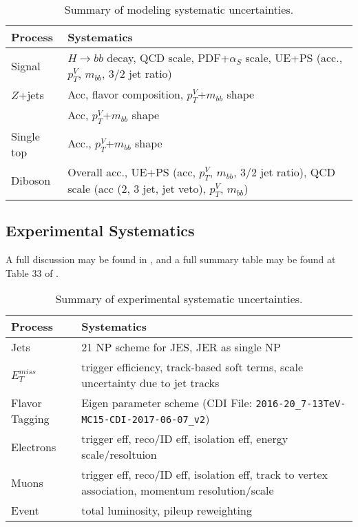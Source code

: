 \begin{table}[!htbp]
  \begin{center}
    \begin{tabular}{lp{5in}}
      \hline\hline
      Process & Systematics\\
      \hline
      Signal  & $H\to bb$ decay, QCD scale, PDF+$\alpha_S$ scale, UE+PS (acc., $p_T^V$, $m_{bb}$, 3/2 jet ratio)\\
      $Z$+jets  & Acc, flavor composition, $p_T^V$+$m_{bb}$ shape\\
      \tt  & Acc, $p_T^V$+$m_{bb}$ shape\\
      Single top  & Acc., $p_T^V$+$m_{bb}$ shape\\
      Diboson  &  Overall acc., UE+PS (acc, $p_T^V$, $m_{bb}$, 3/2 jet ratio), QCD scale  (acc (2, 3 jet, jet veto), $p_T^V$, $m_{bb}$)\\
      \hline\hline
    \end{tabular}
  \end{center}
  \caption{Summary of modeling systematic uncertainties.}
  \label{tab:modelsys}
\end{table}

\subsection{Experimental Systematics}
A full discussion may be found in \cite{objectnote}, and a full summary table may be found at Table 33 of \cite{supportnote}.
\begin{table}[!htbp]
  \begin{center}
    \begin{tabular}{lp{5in}}
      \hline\hline
      Process & Systematics\\
      \hline
      Jets  & 21 NP scheme for JES, JER as single NP\\
      $E_T^{miss}$  & trigger efficiency, track-based soft terms, scale uncertainty due to jet tracks\\
      Flavor Tagging  & Eigen parameter scheme (CDI File: \texttt{2016-20\_7-13TeV-MC15-CDI-2017-06-07\_v2}) \\
      Electrons & trigger eff, reco/ID eff, isolation eff, energy scale/resoltuion\\
      Muons  & trigger eff, reco/ID eff, isolation eff, track to vertex association, momentum resolution/scale\\
      Event & total luminosity, pileup reweighting\\
      \hline\hline
    \end{tabular}
  \end{center}
  \caption{Summary of experimental systematic uncertainties.}
  \label{tab:modelexp}
\end{table}

